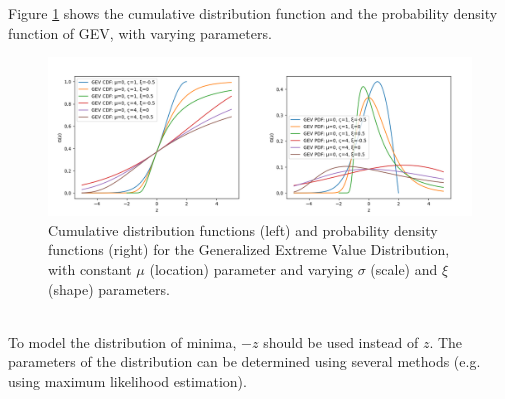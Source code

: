 \documentclass[12pt]{article}
\begin{document}
        Figure \ref{fig:gev} shows the cumulative distribution function and the probability density function of GEV, with varying parameters.\\
        \begin{figure}[t!]
            \centering
            \includegraphics[width=\textwidth]{fig_theory/gev.png}
            \caption{Cumulative distribution functions (left) and probability density functions (right) for the Generalized Extreme Value Distribution, with constant $\mu$ (location) parameter and varying $\sigma$ (scale) and $\xi$ (shape) parameters.}
            \label{fig:gev}
        \end{figure}\\
        To model the distribution of minima, $-z$ should be used instead of $z$. The parameters of the distribution can be determined using several methods (e.g. using maximum likelihood estimation).
\end{document}
